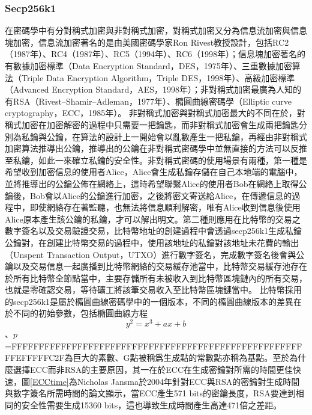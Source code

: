 			\subsubsection{Secp256k1}
			在密碼學中有分對稱式加密與非對稱式加密，對稱式加密又分為信息流加密與信息塊加密，信息流加密著名的是由美國密碼學家Ron Rivest教授設計，包括RC2（1987年）\supercite{OnthedesignandsecurityofRC2}、RC4（1987年）\supercite{Rc4}、RC5（1994年）\supercite{TheRC5encryptionalgorithm}、RC6（1998年）\supercite{TheRC6blockcipher.v1.1August201998}；信息塊加密著名的有數據加密標準（Data Encryption Standard，DES，1975年）\supercite{Dataencryptionstandard}、三重數據加密算法（Triple Data Encryption Algorithm，Triple DES，1998年）\supercite{TrippleDataEncryptionAlgorithmModesofOperation}、高級加密標準（Advanced Encryption Standard，AES，1998年）\supercite{ThedesignofRijndael:AES-theadvancedencryptionstandard}；非對稱式加密最廣為人知的有RSA（Rivest–Shamir–Adleman，1977年）\supercite{Cryptographiccommunicationssystemandmethod}、橢圓曲線密碼學（Elliptic curve cryptography，ECC，1985年）\supercite{Ellipticcurvecryptosystems}。
			非對稱式加密與對稱式加密最大的不同在於，對稱式加密在加密解密的過程中只需要一把鑰匙，而非對稱式加密會生成兩把鑰匙分別為私鑰與公鑰，在算法的設計上一開始會以亂數產生一把私鑰，再經由非對稱式加密算法推導出公鑰，推導出的公鑰在非對稱式密碼學中並無直接的方法可以反推至私鑰，如此一來確立私鑰的安全性。非對稱式密碼的使用場景有兩種，第一種是希望收到加密信息的使用者Alice，Alice會生成私鑰存儲在自己本地端的電腦中，並將推導出的公鑰公佈在網絡上，這時希望聯繫Alice的使用者Bob在網絡上取得公鑰後，Bob會以Alice的公鑰進行加密，之後將密文寄送給Alice，在傳遞信息的過程中，即使網絡存在著監聽，也無法將信息順利解密，唯有Alice收到信息後使用Alice原本產生該公鑰的私鑰，才可以解出明文。第二種則應用在比特幣的交易之數字簽名以及交易驗證交易，比特幣地址的創建過程中會透過secp256k1生成私鑰公鑰對，在創建比特幣交易的過程中，使用該地址的私鑰對該地址未花費的輸出（Unspent Transaction Output，UTXO）進行數字簽名，完成數字簽名後會與公鑰以及交易信息一起廣播到比特幣網絡的交易緩存池當中，比特幣交易緩存池存在於所有比特幣全節點當中，主要存儲所有未被收入到比特幣區塊鏈內的所有交易，也就是零確認交易，等待礦工將該筆交易收入至比特幣區塊鏈當中。
			比特幣採用的secp256k1是屬於橢圓曲線密碼學中的一個版本，不同的橢圓曲線版本的差異在於不同的初始參數，包括橢圓曲線方程$$y^2=x^3+ax+b$$、$p$=FFFFFFFFFFFFFFFFFFFFFFFFFFFFFFFFFFFFFFFFFFFFFFFFFFFFFFFEFFFFFC2F為巨大的素數、G點被稱爲⽣成點的常數點亦稱為基點。至於為什麼選擇ECC而非RSA的主要原因，其一在於ECC在生成密鑰對所需的時間更佳快速，圖\ref{ECCtime}為Nicholas Jansma於2004年針對ECC與RSA的密鑰對生成時間與數字簽名所需時間的論文\supercite{Performancecomparisonofellipticcurveandrsadigitalsignatures}顯示，當ECC產生571 bits的密鑰長度，RSA要達到相同的安全性需要生成15360 bits，這也導致生成時間產生高達471倍之差距。
			
